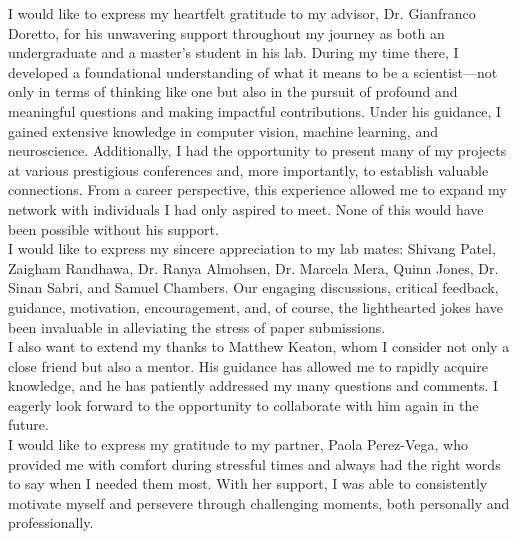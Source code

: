 \documentclass[
12pt, %
oneside, %
english, %
singlespacing, %
liststotoc, %
headsepline, %
chapterinoneline, %
]{MastersDoctoralThesis} %
\begin{document}

\begin{acknowledgements}
\addchaptertocentry{\acknowledgementname}  %

I would like to express my heartfelt gratitude to my advisor, Dr. Gianfranco Doretto, for his unwavering support throughout my journey as both an undergraduate and a master's student in his lab. During my time there, I developed a foundational understanding of what it means to be a scientist—not only in terms of thinking like one but also in the pursuit of profound and meaningful questions and making impactful contributions. Under his guidance, I gained extensive knowledge in computer vision, machine learning, and neuroscience. Additionally, I had the opportunity to present many of my projects at various prestigious conferences and, more importantly, to establish valuable connections. From a career perspective, this experience allowed me to expand my network with individuals I had only aspired to meet. None of this would have been possible without his support. \\

I would like to express my sincere appreciation to my lab mates: Shivang Patel, Zaigham Randhawa, Dr. Ranya Almohsen, Dr. Marcela Mera, Quinn Jones, Dr. Sinan Sabri, and Samuel Chambers. Our engaging discussions, critical feedback, guidance, motivation, encouragement, and, of course, the lighthearted jokes have been invaluable in alleviating the stress of paper submissions. \\

I also want to extend my thanks to Matthew Keaton, whom I consider not only a close friend but also a mentor. His guidance has allowed me to rapidly acquire knowledge, and he has patiently addressed my many questions and comments. I eagerly look forward to the opportunity to collaborate with him again in the future.\\

I would like to express my gratitude to my partner, Paola Perez-Vega, who provided me with comfort during stressful times and always had the right words to say when I needed them most. With her support, I was able to consistently motivate myself and persevere through challenging moments, both personally and professionally. \\


\end{acknowledgements}
\end{document}
